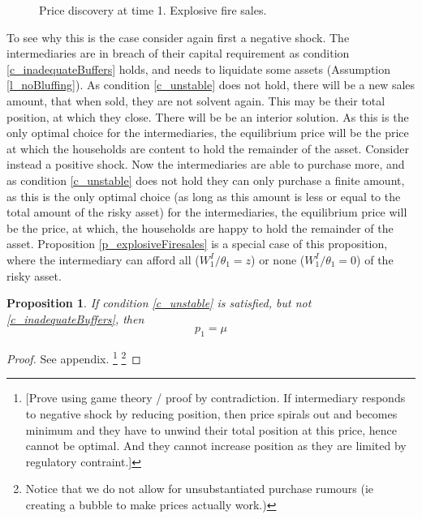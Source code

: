 \documentclass[11pt]{article}
\newtheorem{proposition}{Proposition}
\begin{document}
\begin{appendices}
\begin{figure}[h]
\caption{Price discovery at time 1. Explosive fire sales.}
\label{fig:t1explosiveFS}
\end{figure}

To see why this is the case consider again first a negative shock. The intermediaries are in breach of their capital requirement as condition \ref{c_inadequateBuffers} holds, and needs to liquidate some assets (Assumption \ref{l_noBluffing}). As condition \ref{c_unstable} does not hold, there will be a new sales amount, that when sold, they are not solvent again. This may be their total position, at which they close. There will be be an interior solution. As this is the only optimal choice for the intermediaries, the equilibrium price will be the price at which the households are content to hold the remainder of the asset. Consider instead a positive shock. Now the intermediaries are able to purchase more, and as condition \ref{c_unstable} does not hold they can only purchase a finite amount, as this is the only optimal choice (as long as this amount is less or equal to the total amount of the risky asset) for the intermediaries, the equilibrium price will be the price, at which, the households are happy to hold the remainder of the asset. Proposition \ref{p_explosiveFiresales} is a special case of this proposition, where the intermediary can afford all ($W^I_1/\theta_1 = z$) or none ($W^I_1/\theta_1 = 0$) of the risky asset.



\begin{proposition} \label{p_pricewBuffer}
If condition \ref{c_unstable} is satisfied, but not \ref{c_inadequateBuffers}, then 
\begin{equation}
p_1 = \mu
\end{equation}
\end{proposition}
\begin{proof}
See appendix.
\footnote{[Prove using game theory / proof by contradiction. If intermediary responds to negative shock by reducing position, then price spirals out and becomes minimum and they have to unwind their total position at this price, hence cannot be optimal. And they cannot increase position as they are limited by regulatory contraint.]}
\footnote{Notice that we do not allow for unsubstantiated purchase rumours (ie creating a bubble to make prices actually work.)}
\end{proof}


\end{appendices}
\end{document}
